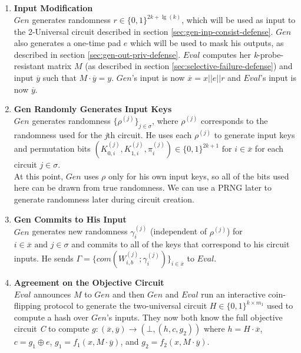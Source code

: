 \documentclass{article}
\begin{document}
\begin{enumerate}
	\item \label{step:inputs} \textbf{Input Modification}\\
	$Gen$ generates randomness $r \in \{0,1\}^{2k+\lg(k)}$, which will be used as input to the 2-Universal circuit described in section \ref{sec:gen-inp-consist-defense}. $Gen$ also generates a one-time pad $e$ which will be used to mask his outputs, as described in section \ref{sec:gen-out-priv-defense}. $Eval$ computes her \emph{k}-probe-resistant matrix $M$ (as described in section \ref{sec:selective-failure-defense}) and input $\overline{y}$ such that $M \cdot \overline{y} = y$. $Gen$'s input is now $\overline{x} = x || e || r$ and $Eval$'s input is now $\overline{y}$.
	
	\item \textbf{Gen Randomly Generates Input Keys}\\
	$Gen$ generates randomness $\{\rho^{(j)}\}_{j \in \sigma}$, where $\rho^{(j)}$ corresponds to the randomness used for the \emph{j}th circuit. He uses each $\rho^{(j)}$ to generate input keys and permutation bits $(K_{0,i}^{(j)},K_{1,i}^{(j)},\pi_{i}^{(j)}) \in \{0,1\}^{2k+1} \text{ for } i \in \overline{x}$ for each circuit $j \in \sigma$.\\
	
	At this point, $Gen$ uses $\rho$ only for his own input keys, so all of the bits used here can be drawn from true randomness. We can use a PRNG later to generate randomness later during circuit creation.
	
	\item \label{step:gen-inp-commit} \textbf{Gen Commits to His Input}\\
	$Gen$ generates new randomness $\gamma_{i}^{(j)}$ (independent of $\rho^{(j)}$) for $i \in \overline{x} \text{ and  }j \in \sigma$ and commits to all of the keys that correspond to his circuit inputs. He sends $\Gamma = \{com(W_{i,b}^{(j)};\gamma_{i}^{(j)})\}_{i \in \overline{x}}$ to $Eval$.
	
	\item \textbf{Agreement on the Objective Circuit}\\
	$Eval$ announces $M$ to $Gen$ and then $Gen$ and $Eval$ run an interactive coin-flipping protocol to generate the two-universal circuit $H \in \{0,1\}^{k \times m_1}$ used to compute a hash over $Gen$'s inputs. They now both know the full objective circuit \emph{C} to compute $g : (\overline{x},\overline{y}) \rightarrow (\bot, (h,c,g_2))$ where $h = H \cdot \overline{x}$, $c=g_{1}\oplus e$, $g_{1} = f_{1}(x, M\cdot\overline{y})$, and $g_{2} = f_{2}(x,M\cdot\overline{y})$.\\
	

\end{enumerate}
\end{document}
